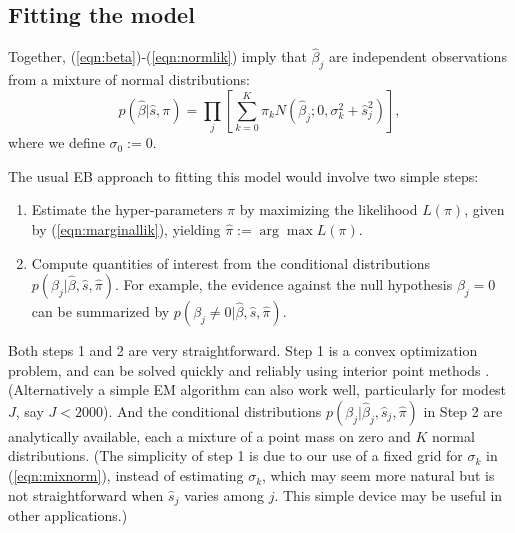 \documentclass[11pt]{article}
\def\bhat{\hat{\beta}}
\def\shat{\hat{s}}
\begin{document}
% 
% 
 

\subsection*{Fitting the model}
 
Together, (\ref{eqn:beta})-(\ref{eqn:normlik}) imply that $\bhat_j$ are independent observations from a mixture of normal distributions:
\begin{equation} \label{eqn:marginallik}
p(\bhat | \shat, \pi) =   \prod_j  \left[\sum_{k=0}^K \pi_k N(\bhat_j; 0, \sigma_k^2 + \shat_j^2) \right],
\end{equation}
where we define $\sigma_0:=0$.

The usual EB approach to fitting this model would involve two simple steps:
\begin{enumerate}
\item Estimate the hyper-parameters $\pi$ by maximizing the likelihood $L(\pi)$, given by (\ref{eqn:marginallik}), yielding $\hat{\pi} := \arg \max L(\pi)$.
\item Compute quantities of interest from the conditional distributions $p(\beta_j | \bhat, \shat, \hat{\pi})$. For example, the evidence
against the null hypothesis $\beta_j=0$ can be summarized by $p(\beta_j \neq 0 | \bhat, \shat,\hat{\pi})$.
\end{enumerate}
Both steps 1 and 2 are very straightforward. Step 1 is a convex optimization problem, and can be solved quickly and reliably using interior point methods \cite{boyd2004convex,koenker2013convex}. (Alternatively a simple EM algorithm can also work well, particularly for modest $J$, say $J<2000$). 
And the conditional distributions $p(\beta_j | \bhat_j, \shat_j,\hat{\pi})$ in Step 2 are analytically available, each a mixture of a point mass on zero and $K$ normal distributions.
(The simplicity of step 1 is due to our use of a fixed grid for $\sigma_k$ in (\ref{eqn:mixnorm}), instead of estimating $\sigma_k$,
which may seem more natural but is not straightforward when $\shat_j$ varies among $j$. This simple device may be useful in other applications.)
\end{document}
